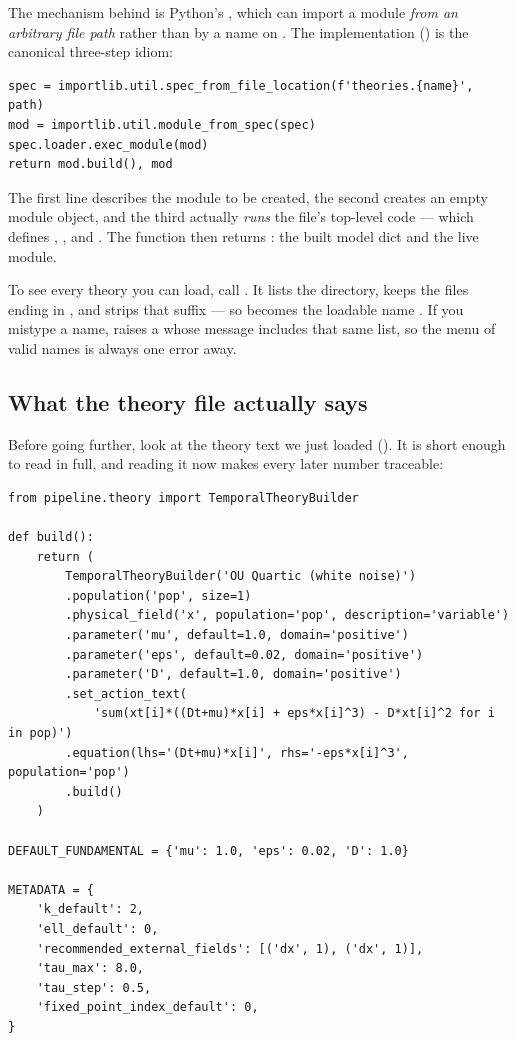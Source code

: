 The mechanism behind  is Python's
, which can import a module \emph{from an arbitrary file
path} rather than by a name on . The implementation
() is the canonical three-step idiom:

\begin{lstlisting}
spec = importlib.util.spec_from_file_location(f'theories.{name}', path)
mod = importlib.util.module_from_spec(spec)
spec.loader.exec_module(mod)
return mod.build(), mod
\end{lstlisting}

The first line describes the module to be created, the second creates an empty
module object, and the third actually \emph{runs} the file's top-level code ---
which defines , , and . The
function then returns : the built model dict and the
live module.

\begin{note}
To see every theory you can load, call . It lists the
 directory, keeps the files ending in , and
strips that suffix --- so  becomes the loadable name
. If you mistype a name,  raises a
 whose message includes that same list, so the menu of
valid names is always one error away.
\end{note}

\subsection{What the theory file actually says}

Before going further, look at the theory text we just loaded
(). It is short enough to read in full, and
reading it now makes every later number traceable:

\begin{lstlisting}
from pipeline.theory import TemporalTheoryBuilder

def build():
    return (
        TemporalTheoryBuilder('OU Quartic (white noise)')
        .population('pop', size=1)
        .physical_field('x', population='pop', description='variable')
        .parameter('mu', default=1.0, domain='positive')
        .parameter('eps', default=0.02, domain='positive')
        .parameter('D', default=1.0, domain='positive')
        .set_action_text(
            'sum(xt[i]*((Dt+mu)*x[i] + eps*x[i]^3) - D*xt[i]^2 for i in pop)')
        .equation(lhs='(Dt+mu)*x[i]', rhs='-eps*x[i]^3', population='pop')
        .build()
    )

DEFAULT_FUNDAMENTAL = {'mu': 1.0, 'eps': 0.02, 'D': 1.0}

METADATA = {
    'k_default': 2,
    'ell_default': 0,
    'recommended_external_fields': [('dx', 1), ('dx', 1)],
    'tau_max': 8.0,
    'tau_step': 0.5,
    'fixed_point_index_default': 0,
}
\end{lstlisting}

